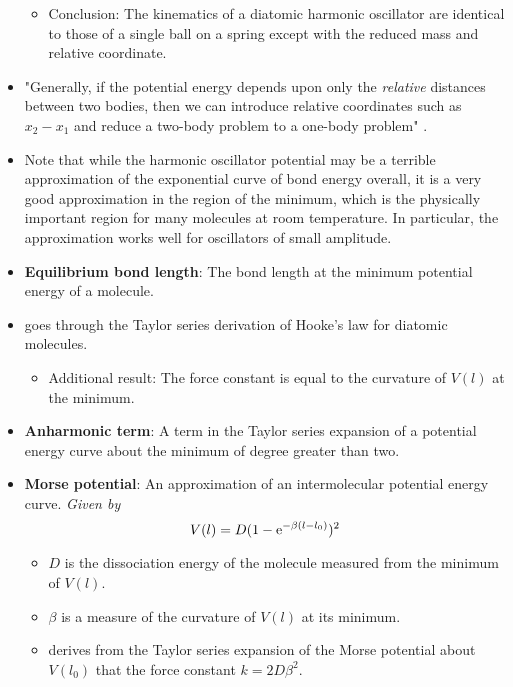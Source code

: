 \documentclass[../notes.tex]{subfiles}
\begin{document}
\begin{itemize}
\begin{itemize}
        \item Conclusion: The kinematics of a diatomic harmonic oscillator are identical to those of a single ball on a spring except with the reduced mass and relative coordinate.
    \end{itemize}
    \item "Generally, if the potential energy depends upon only the \emph{relative} distances between two bodies, then we can introduce relative coordinates such as $x_2-x_1$ and reduce a two-body problem to a one-body problem" \parencite[163]{bib:McQuarrieSimon}.
    \item Note that while the harmonic oscillator potential may be a terrible approximation of the exponential curve of bond energy overall, it is a very good approximation in the region of the minimum, which is the physically important region for many molecules at room temperature. In particular, the approximation works well for oscillators of small amplitude.
    \item \textbf{Equilibrium bond length}: The bond length at the minimum potential energy of a molecule.
    \item \textcite{bib:McQuarrieSimon} goes through the Taylor series derivation of Hooke's law for diatomic molecules.
    \begin{itemize}
        \item Additional result: The force constant is equal to the curvature of $V(l)$ at the minimum.
    \end{itemize}
    \item \textbf{Anharmonic term}: A term in the Taylor series expansion of a potential energy curve about the minimum of degree greater than two.
    \item \textbf{Morse potential}: An approximation of an intermolecular potential energy curve. \emph{Given by}
    \begin{equation*}
        V(l) = D(1-\e[-\beta(l-l_0)])^2
    \end{equation*}
    \begin{itemize}
        \item $D$ is the dissociation energy of the molecule measured from the minimum of $V(l)$.
        \item $\beta$ is a measure of the curvature of $V(l)$ at its minimum.
        \item \textcite{bib:McQuarrieSimon} derives from the Taylor series expansion of the Morse potential about $V(l_0)$ that the force constant $k=2D\beta^2$.
    \end{itemize}

\end{itemize}
\end{document}
